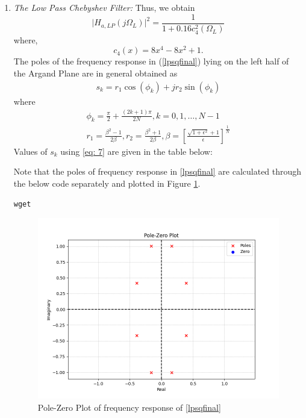 \documentclass{article}
\begin{document}
\begin{enumerate}
\item {\em The Low Pass Chebyshev Filter:} Thus, we obtain
\begin{equation}
\label{lpsqfinal}
\vert H_{a,LP}(j\Omega_L)\vert^2 = \frac{1}{1 + 0.16c_4^2(\Omega_L)}
\end{equation}
where,
\begin{equation}
c_4(x) = 8x^4 - 8x^2 + 1.	
\end{equation}
The poles of the frequency response in (\ref{lpsqfinal}) lying on the left half of the Argand Plane are in general obtained as
\begin{align}
    s_k = r_1\cos(\phi_k)+ jr_2\sin( \phi_k) \label{eq: 7}
\end{align}
where
\begin{eqnarray}
\label{lppoles}
\phi_k = \frac{\pi}{2} + \frac{(2k+1)\pi}{2N}, k = 0, 1, \dots, N-1 \nonumber \\
r_1 = \frac{\beta^2 - 1}{2\beta}, r_2 = \frac{\beta^2 + 1}{2\beta}, \beta = \left[ \frac{\sqrt{1 + \epsilon^2} + 1}{\epsilon}\right]^{\frac{1}{N}}
\end{eqnarray}
Values of $s_k$ using \eqref{eq: 7} are given in the table below:


Note that the poles of frequency response in \eqref{lpsqfinal} are calculated through the below code separately and plotted in Figure \ref{fig:2}.\\

\begin{lstlisting}[caption = {Code for Figure 2}]
wget 
\end{lstlisting}

\begin{figure}[!h]
    \centering
    \includegraphics[width = \columnwidth]{figs/pole_zero.png}
    \caption{Pole-Zero Plot of frequency response of \eqref{lpsqfinal}}
    \label{fig:2}
\end{figure}


\end{enumerate}
\end{document}
